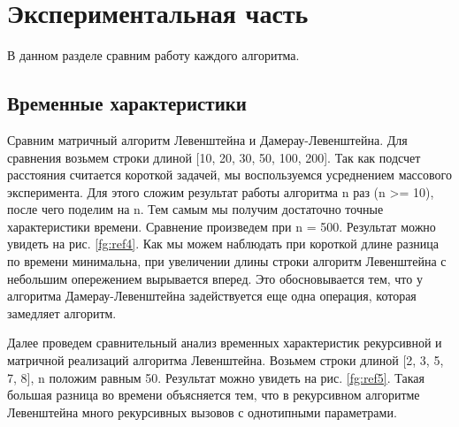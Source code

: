 \chapter{Экспериментальная часть}

В данном разделе сравним работу каждого алгоритма.

\section{Временные характеристики}

Сравним матричный алгоритм Левенштейна и Дамерау-Левенштейна.
Для сравнения возьмем строки длиной [10, 20, 30, 50, 100, 200]. 
Так как подсчет расстояния считается короткой задачей, мы воспользуемся усреднением массового эксперимента. 
Для этого сложим результат работы алгоритма n раз (n >= 10), после чего поделим на n. 
Тем самым мы получим достаточно точные характеристики времени. 
Сравнение произведем при n = 500.
Результат можно увидеть на рис.  \ref{fg:ref4}. Как мы можем наблюдать при короткой длине разница по времени минимальна, при увеличении длины строки алгоритм Левенштейна с небольшим опережением вырывается вперед. Это обосновывается тем, что у алгоритма Дамерау-Левенштейна задействуется еще одна операция, которая замедляет алгоритм.

\begin{figure}[ht!]
\end{figure}

Далее проведем сравнительный анализ временных характеристик рекурсивной и матричной реализаций алгоритма Левенштейна. 
Возьмем строки длиной [2, 3, 5, 7, 8], n положим равным 50.
Результат можно увидеть на рис. \ref{fg:ref5}.
Такая большая разница во времени объясняется тем, что в рекурсивном алгоритме Левенштейна много рекурсивных вызовов с однотипными параметрами.

